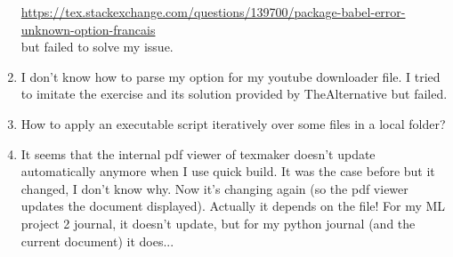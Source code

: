 \documentclass[11pt,a4paper]{article} %
\begin{document}
\begin{enumerate}
\url{https://tex.stackexchange.com/questions/139700/package-babel-error-unknown-option-francais}\\
but failed to solve my issue.
\item I don't know how to parse my option for my youtube downloader file. I tried to imitate the exercise and its solution provided by TheAlternative but failed.
\item How to apply an executable script iteratively over some files in a local folder?
\item It seems that the internal pdf viewer of texmaker doesn't update automatically anymore when I use quick build. It was the case before but it changed, I don't know why. Now it's changing again (so the pdf viewer updates the document displayed). Actually it depends on the file! For my ML project 2 journal, it doesn't update, but for my python journal (and the current document) it does...
\end{enumerate}
\end{document}
